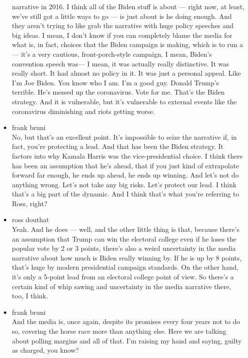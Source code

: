\begin{itemize}
  narrative in 2016. I think all of the Biden stuff is about --- right
  now, at least, we've still got a little ways to go --- is just about
  is he doing enough. And they aren't trying to like grab the narrative
  with huge policy speeches and big ideas. I mean, I don't know if you
  can completely blame the media for what is, in fact, choices that the
  Biden campaign is making, which is to run a --- it's a very cautious,
  front-porch-style campaign. I mean, Biden's convention speech was--- I
  mean, it was actually really distinctive. It was really short. It had
  almost no policy in it. It was just a personal appeal. Like I'm Joe
  Biden. You know who I am. I'm a good guy. Donald Trump's terrible.
  He's messed up the coronavirus. Vote for me. That's the Biden
  strategy. And it is vulnerable, but it's vulnerable to external events
  like the coronavirus diminishing and riots getting worse.
\item
  frank bruni\\
  No, but that's an excellent point. It's impossible to seize the
  narrative if, in fact, you're protecting a lead. And that has been the
  Biden strategy. It factors into why Kamala Harris was the
  vice-presidential choice. I think there has been an assumption that
  he's ahead, that if you just kind of extrapolate forward far enough,
  he ends up ahead, he ends up winning. And let's not do anything wrong.
  Let's not take any big risks. Let's protect our lead. I think that's a
  big part of the dynamic. And I think that's what you're referring to
  Ross, right?
\item
  ross douthat\\
  Yeah. And he does --- well, and the other little thing is that,
  because there's an assumption that Trump can win the electoral college
  even if he loses the popular vote by 2 or 3 points, there's also a
  weird uncertainty in the media narrative about how much is Biden
  really winning by. If he is up by 8 points, that's huge by modern
  presidential campaign standards. On the other hand, it's only a
  5-point lead from an electoral college point of view. So there's a
  certain kind of whip sawing and uncertainty in the media narrative
  there, too, I think.
\item
  frank bruni\\
  And the media is, once again, despite its promises every four years
  not to do so, covering the horse race more than anything else. Here we
  are talking about polling margins and all of that. I'm raising my hand
  and saying, guilty as charged, you know?

\end{itemize}
